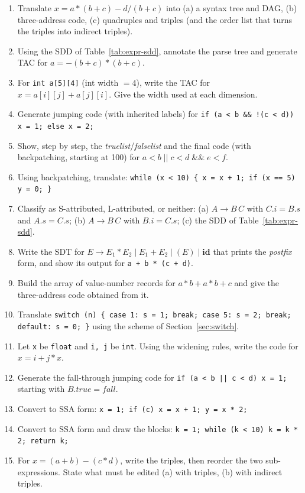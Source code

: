 \documentclass[11pt,a4paper]{article}
\begin{document}
\begin{enumerate}[label=\textbf{Q\arabic*.}]
\item Translate $x = a * (b + c) - d / (b + c)$ into (a) a syntax tree and DAG, (b) three-address code, (c) quadruples and triples (and the order list that turns the triples into indirect triples).
\item Using the SDD of Table~\ref{tab:expr-sdd}, annotate the parse tree and generate TAC for $a = -(b + c) * (b + c)$.
\item For \texttt{int a[5][4]} (int width $=4$), write the TAC for $x = a[i][j] + a[j][i]$. Give the width used at each dimension.
\item Generate jumping code (with inherited labels) for \texttt{if (a < b \&\& !(c < d)) x = 1; else x = 2;}
\item Show, step by step, the \textit{truelist}/\textit{falselist} and the final code (with backpatching, starting at 100) for $a<b \;||\; c<d \;\&\&\; e<f$.
\item Using backpatching, translate: \texttt{while (x < 10) \{ x = x + 1; if (x == 5) y = 0; \}}
\item Classify as S-attributed, L-attributed, or neither: (a) $A \to B\,C$ with $C.i = B.s$ and $A.s = C.s$; (b) $A \to B\,C$ with $B.i = C.s$; (c) the SDD of Table~\ref{tab:expr-sdd}.
\item Write the SDT for $E \to E_1 * E_2 \mid E_1 + E_2 \mid (E) \mid \mathbf{id}$ that prints the \emph{postfix} form, and show its output for \texttt{a + b * (c + d)}.
\item Build the array of value-number records for $a*b + a*b + c$ and give the three-address code obtained from it.
\item Translate \texttt{switch (n) \{ case 1: s = 1; break; case 5: s = 2; break; default: s = 0; \}} using the scheme of Section~\ref{sec:switch}.
\item Let \texttt{x} be \texttt{float} and \texttt{i, j} be \texttt{int}. Using the widening rules, write the code for $x = i + j * x$.
\item Generate the fall-through jumping code for \texttt{if (a < b || c < d) x = 1;} starting with $B.true=\textit{fall}$.
\item Convert to SSA form: \texttt{x = 1; if (c) x = x + 1; y = x * 2;}
\item Convert to SSA form and draw the blocks: \texttt{k = 1; while (k < 10) k = k * 2; return k;}
\item For $x=(a+b)-(c*d)$, write the triples, then reorder the two sub-expressions. State what must be edited (a) with triples, (b) with indirect triples.

\end{enumerate}
\end{document}
